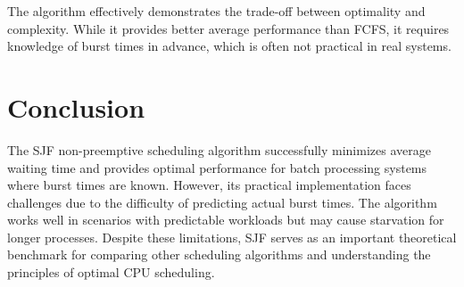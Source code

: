 \documentclass[12pt,a4paper]{article}
\begin{document}
The algorithm effectively demonstrates the trade-off between optimality and complexity. While it provides better average performance than FCFS, it requires knowledge of burst times in advance, which is often not practical in real systems.

\section{Conclusion}
The SJF non-preemptive scheduling algorithm successfully minimizes average waiting time and provides optimal performance for batch processing systems where burst times are known. However, its practical implementation faces challenges due to the difficulty of predicting actual burst times. The algorithm works well in scenarios with predictable workloads but may cause starvation for longer processes. Despite these limitations, SJF serves as an important theoretical benchmark for comparing other scheduling algorithms and understanding the principles of optimal CPU scheduling.
\end{document}
